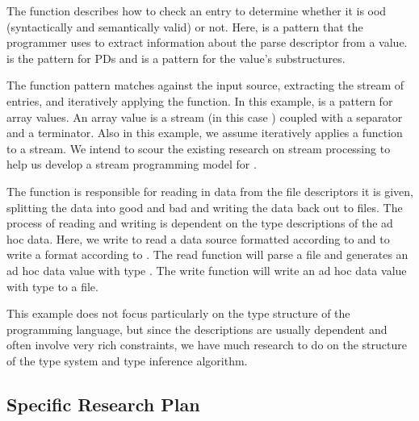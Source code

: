 \documentclass[11pt]{article}
\begin{document}
The  function describes how to check an entry
to determine whether it is ood (syntactically and semantically
valid) or not.  
Here,  is a pattern that the programmer uses
to extract information about the parse descriptor from a value. 
 is the pattern for PDs and  is a pattern for 
the value's substructures.  

The  function pattern matches against the
input source, extracting the stream of entries, and iteratively
applying the  function.  In this example,
 is a pattern for array values.
An array value is a stream (in this case )
coupled with a separator and a terminator.  Also in this example,
we assume  
iteratively applies a function to a stream.  We intend to
scour the existing research on stream processing to help us
develop a stream programming model for \datatype. 

The function  is responsible for reading in
data from the file descriptors it is given,
splitting the data into good and bad 
and writing the data back out to files.
The process of reading and writing is dependent on the
type descriptions of the ad hoc data.  Here, we write
 to read a data source formatted according to 
and  to write a format according to .
The read function will parse a file and generates an ad hoc data value with
type .  The write function will write an ad hoc data value with
type  to a file.

This example does not focus particularly on the type structure of the
programming language, but since the \datatype{} descriptions
are usually dependent and often involve very rich constraints,
we have much research to do on the structure of the \datatype{} type
system and type inference algorithm.

\subsection{Specific Research Plan}
\label{sec:plan}
\end{document}
